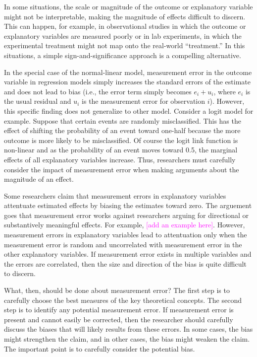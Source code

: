 \documentclass[12pt]{article}
\newcommand{\carlisle}[1]{\textcolor{magenta}{#1}}
\begin{document}
In some situations, the scale or magnitude of the outcome or explanatory variable might not be interpretable, making the magnitude of effects difficult to discern. This can happen, for example, in observational studies in which the outcome or explanatory variables are measured poorly or in lab experiments, in which the experimental treatment might not map onto the real-world ``treatment.'' In this situations, a simple sign-and-significance approach is a compelling alternative.


In the special case of the normal-linear model, measurement error in the outcome variable in regression models simply increases the standard errors of the estimate and does not lead to bias (i.e., the error term simply becomes $e_i + u_i$, where $e_i$ is the usual residual and $u_i$ is the measurement error for observation $i$). However, this specific finding does not generalize to other model. Consider a logit model for example. Suppose that certain events are randomly misclassified. This has the effect of shifting the probability of an event toward one-half because the more outcome is more likely to be misclassified. Of course the logit link function is non-linear and as the probability of an event moves toward 0.5, the marginal effects of all explanatory variables increase. Thus, researchers must carefully consider the impact of measurement error when making arguments about the magnitude of an effect.  


Some researchers claim that measurement errors in explanatory variables attentuate estimated effects by biasing the estimates toward zero. The arguement goes that measurement error works against researchers arguing for directional or substantively meaningful effects. For example, \carlisle{[add an example here]}. However, measurement errors in explanatory variables lead to attentuation only when the measurement error is random and uncorrelated with measurement error in the other explanatory variables. If measurement error exists in multiple variables and the errors are correlated, then the size and direction of the bias is quite difficult to discern. 


What, then, should be done about measurement error? The first step is to carefully choose the best measures of the key theoretical concepts. The second step is to identify any potential measurement error. If measurement error is present and cannot easily be corrected, then the researcher should carefully discuss the biases that will likely results from these errors. In some cases, the bias might strengthen the claim, and in other cases, the bias might weaken the claim. The important point is to carefully consider the potential bias.
\end{document}
